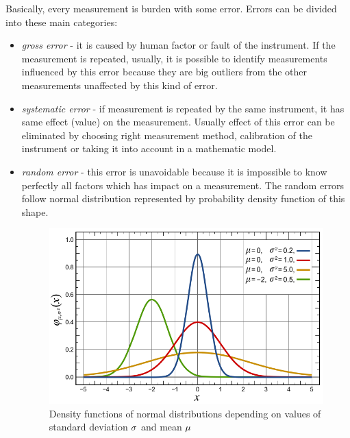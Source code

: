 \documentclass[a4paper,12pt]{article}
\newcommand{\escal}[1]{%
{\it #1}%
}
\newcommand{\term}[1]{%
{\it #1}%
}
\begin{document}

Basically, every measurement is burden with some error. Errors can be divided into these main categories:  
\begin{itemize}
\item \term{gross error} - it is caused by human factor or fault of the instrument. If the measurement is repeated,
usually, it is possible to identify measurements influenced by this error because 
they are big outliers from the other measurements unaffected by this 
kind of error.
\item \term{systematic error} - if measurement is repeated by the same instrument,
it has same effect (value) on the measurement.  Usually effect of this error can be 
eliminated by choosing right measurement method, calibration of the instrument or taking it into account in a mathematic model.
\item \term{random error} - this error is unavoidable because it is impossible to know perfectly all factors which has impact 
on a measurement. The random errors follow normal distribution represented by probability density function of this shape.


\begin{figure}[h]
    \centering
   \includegraphics[scale=0.4]{figures/normal_dist.png}
    \caption{Density functions of normal distributions depending on values of standard deviation 
$\escal{\sigma}$ and mean $\escal{\mu}$ \cite{inductiveload2008selection}}
    \label{fig:norm_dist}
\end{figure}


\end{itemize}
\end{document}
